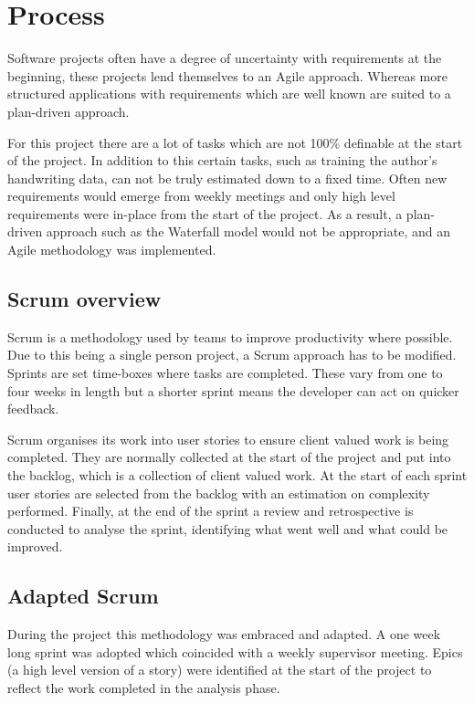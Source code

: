 \section{Process}
Software projects often have a degree of uncertainty with requirements at the beginning, these projects lend themselves to an Agile approach. Whereas more structured applications with requirements which are well known are suited to a plan-driven approach.

For this project there are a lot of tasks which are not 100\% definable at the start of the project. In addition to this certain tasks, such as training the author's handwriting data, can not be truly estimated down to a fixed time. Often new requirements would emerge from weekly meetings and only high level requirements were in-place from the start of the project. As a result, a plan-driven approach such as the Waterfall model would not be appropriate, and an Agile methodology was implemented.

\subsection{Scrum overview}
Scrum \cite{citeulike:14014350} is a methodology used by teams to improve productivity where possible. Due to this being a single person project, a Scrum approach has to be modified. Sprints are set time-boxes where tasks are completed. These vary from one to four weeks in length but a shorter sprint means the developer can act on quicker feedback.

Scrum organises its work into user stories to ensure client valued work is being completed. They are normally collected at the start of the project and put into the backlog, which is a collection of client valued work. At the start of each sprint user stories are selected from the backlog with an estimation on complexity performed. Finally, at the end of the sprint a review and retrospective is conducted to analyse the sprint, identifying what went well and what could be improved.

\subsection{Adapted Scrum}
During the project this methodology was embraced and adapted. A one week long sprint was adopted which coincided with a weekly supervisor meeting. Epics (a high level version of a story) were identified at the start of the project to reflect the work completed in the analysis phase.

